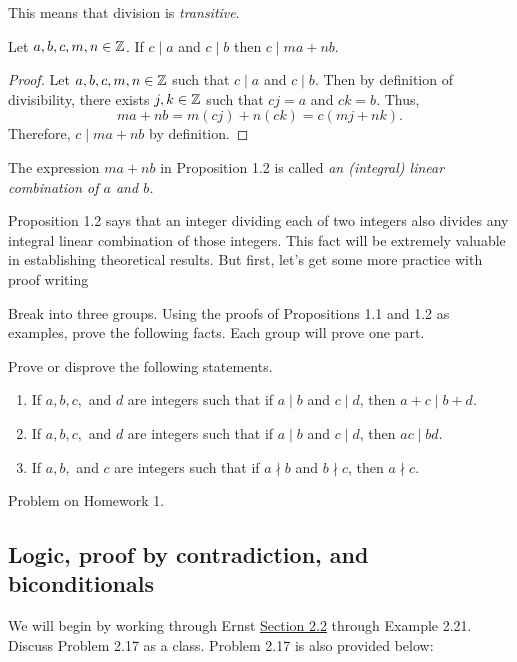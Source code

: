\documentclass{ximera}
\begin{document}
This means that division is \emph{transitive}. 


\begin{proposition}
  Let $a,b,c,m,n\in\mathbb Z$.
  If $c\mid a$ and $c\mid b$ then $c\mid ma+nb$.

  \begin{proof}
    Let $a,b,c,m,n\in\mathbb Z$ such that $c\mid a$ and $c\mid b$. Then by definition of divisibility, there exists $j,k\in\mathbb Z$ such that $cj=a$ and $ck=b$. Thus, \[ma+nb=m(cj)+n(ck)=c(mj+nk).\] Therefore, $c\mid ma+nb$ by definition.
  \end{proof}
\end{proposition}

\begin{defn}
The expression $ma+nb$ in Proposition 1.2 is called \emph{an (integral) linear combination of $a$ and $b$.}
\end{defn}
Proposition 1.2 says that an integer dividing each of two integers also divides any integral linear combination of those integers. This fact will be extremely valuable in establishing theoretical results. But first, let's get some more practice with proof writing

Break into three groups. Using the proofs of Propositions 1.1 and 1.2 as examples, prove the following facts. Each group will prove one part.

\begin{br}\label{divisfacts}
Prove or disprove the following statements.
\begin{enumerate}[label=(\alph*)]
\item If $a,b,c,$ and $d$ are integers such that if $a\mid b$ and $c\mid d$, then $a+c\mid b+d$.
\item If $a,b,c,$ and $d$ are integers such that if $a\mid b$ and $c\mid d$, then $ac\mid bd$.
\item If $a,b,$ and $c$ are integers such that if $a\nmid b$ and $b\nmid c$, then $a\nmid c$.
\end{enumerate}
\end{br}
\begin{solution}
Problem on Homework 1.
\end{solution}

\subsection{Logic, proof by contradiction, and biconditionals} 

We will begin by working through Ernst \href{https://danaernst.com/IBL-IntroToProof/pretext/sec_Intro_to_Logic.html}{Section 2.2} through Example 2.21. Discuss Problem 2.17 as a class. Problem 2.17 is also provided below:
\end{document}
